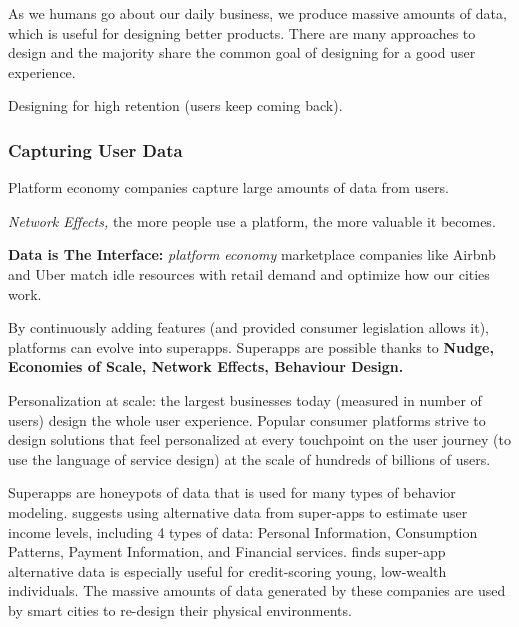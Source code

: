 \documentclass[
  letterpaper,
  DIV=11,
  numbers=noendperiod]{scrartcl}
\begin{document}
As we humans go about our daily business, we produce massive amounts of
data, which is useful for designing better products. There are many
approaches to design and the majority share the common goal of designing
for a good user experience.

Designing for high retention (users keep coming back).

\subsubsection{Capturing User Data}\label{capturing-user-data}

Platform economy companies capture large amounts of data from users.

\emph{Network Effects,} the more people use a platform, the more
valuable it becomes.

\textbf{Data is The Interface:} \emph{platform economy} marketplace
companies like Airbnb and Uber match idle resources with retail demand
and optimize how our cities work.

By continuously adding features (and provided consumer legislation
allows it), platforms can evolve into superapps. Superapps are possible
thanks to \textbf{Nudge, Economies of Scale, Network Effects, Behaviour
Design.}

Personalization at scale: the largest businesses today (measured in
number of users) design the whole user experience. Popular consumer
platforms strive to design solutions that feel personalized at every
touchpoint on the user journey (to use the language of service design)
at the scale of hundreds of billions of users.

Superapps are honeypots of data that is used for many types of behavior
modeling. \citep{suarezEnhancingUserIncome2021} suggests using
alternative data from super-apps to estimate user income levels,
including 4 types of data: Personal Information, Consumption Patterns,
Payment Information, and Financial services.
\citep{roaSuperappBehavioralPatterns2021} finds super-app alternative
data is especially useful for credit-scoring young, low-wealth
individuals. The massive amounts of data generated by these companies
are used by smart cities to re-design their physical environments.
\end{document}
